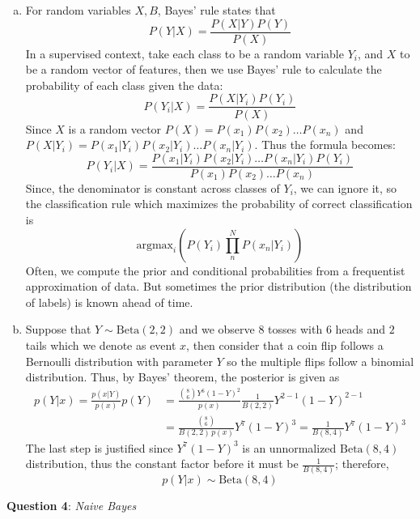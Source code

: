 \documentclass{article} %
\newcommand{\question}[2][]{
  \begin{flushleft}
    \textbf{Question #1}: \textit{#2}

\end{flushleft}}
\begin{document}
\begin{enumerate}[(a)]
  \item For random variables $X, B$, Bayes' rule states that
    \[
      P(Y|X) = \frac{P(X|Y)P(Y)}{P(X)}
    \]
    In a supervised context, take each class to be a random variable
    $Y_i$, and $X$ to be a random vector of features, then we use
    Bayes' rule to calculate the probability of each class given the
    data:
    \[
      P(Y_i|X) = \frac{P(X|Y_i)P(Y_i)}{P(X)}
    \]
    Since $X$ is a random vector $P(X) = P(x_1)P(x_2)\hdots P(x_n)$
    and $P(X|Y_i) = P(x_1|Y_i)P(x_2|Y_i)\hdots P(x_n|Y_i)$. Thus the
    formula becomes:
    \[
      P(Y_i|X) = \frac{P(x_1|Y_i)P(x_2|Y_i)\hdots
      P(x_n|Y_i)P(Y_i)}{P(x_1)P(x_2)\hdots P(x_n)}
    \]
    Since, the denominator is constant across classes of $Y_i$, we
    can ignore it, so the classification rule which maximizes the
    probability of correct classification is
    \[
      \text{argmax}_i \left( P(Y_i)\prod_n^N P(x_n|Y_i)\right)
    \]
    Often, we compute the prior and conditional probabilities from a
    frequentist approximation of data. But sometimes the prior
    distribution (the distribution of labels) is known ahead of time.
  \item Suppose that $Y \sim \text{Beta}(2,2)$ and we observe $8$
    tosses with $6$ heads and $2$ tails which we denote as event $x$,
    then consider that a coin flip follows a Bernoulli distribution
    with parameter $Y$ so the multiple flips follow a binomial
    distribution. Thus, by Bayes' theorem, the posterior is given as
    \begin{align*}
      p(Y | x) = \frac{p(x|Y)}{p(x)}p(Y) &=
      \frac{\binom{8}{6}Y^{6}(1-Y)^{2}}{p(x)}\frac{1}{B(2,2)}Y^{2-1}(1-Y)^{2-1}\\
      &= \frac{\binom{8}{6}}{B(2,2)\,p(x)}Y^{7}(1-Y)^{3}
      = \frac{1}{B(8,4)}Y^{7}(1-Y)^{3}
    \end{align*}
    The last step is justified since $Y^7(1-Y)^{3}$ is an
    unnormalized $\text{Beta}(8,4)$ distribution, thus the constant
    factor before it must be $\frac{1}{B(8,4)}$; therefore,
    \[
      p(Y|x)\sim \text{Beta}{(8,4)}
    \]

\end{enumerate}
\question[4]{Naive Bayes}
\end{document}
